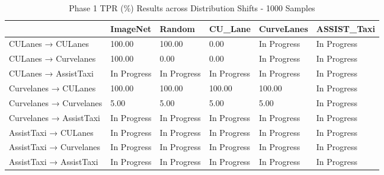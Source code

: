 \begin{table}
\caption{Phase 1 TPR (\%) Results across Distribution Shifts - 1000 Samples}
\label{tab:phase1_tpr_1000}
\begin{tabular}{llllll}
\toprule
 & ImageNet & Random & CU_Lane & CurveLanes & ASSIST_Taxi \\
\midrule
CULanes → CULanes & 100.00 & 100.00 & 0.00 & In Progress & In Progress \\
CULanes → Curvelanes & 100.00 & 0.00 & 0.00 & In Progress & In Progress \\
CULanes → AssistTaxi & In Progress & In Progress & In Progress & In Progress & In Progress \\
Curvelanes → CULanes & 100.00 & 100.00 & 100.00 & 100.00 & In Progress \\
Curvelanes → Curvelanes & 5.00 & 5.00 & 5.00 & 5.00 & In Progress \\
Curvelanes → AssistTaxi & In Progress & In Progress & In Progress & In Progress & In Progress \\
AssistTaxi → CULanes & In Progress & In Progress & In Progress & In Progress & In Progress \\
AssistTaxi → Curvelanes & In Progress & In Progress & In Progress & In Progress & In Progress \\
AssistTaxi → AssistTaxi & In Progress & In Progress & In Progress & In Progress & In Progress \\
\bottomrule
\end{tabular}
\end{table}
